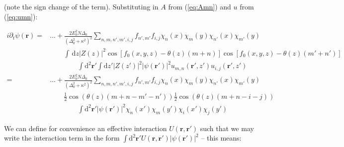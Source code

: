 \documentclass[a4paper,nobalancelastpage]{revtex4-1}
\newcommand{\vect}[1]{\bm{#1}}
\begin{document}
(note the sign change of the term). Substituting in $A$ from (\ref{eq:Amn}) and $u$ from (\ref{eq:umn}):

\begin{align}
i \partial_t \psi(\vect{r})=&...+ \frac{ 2E^2_0 N \Delta_0 }{(\Delta_0^2+\kappa^2)^2} \sum_{n,m,n',m',i,j}f_{n',m'} f_{i,j}
\chi_n\left( x \right)
  \chi_m\left( y \right) \chi_{n'}\left( x \right)
  \chi_{m'}\left( y \right) \nonumber  \\& \qquad
   \int \, \mathrm{d}z |Z(z)|^2    \cos \left[ f_0(x,y,z) - \theta(z) (m+n) \right]  \cos \left[ f_0(x,y,z) - \theta(z) (m'+n') \right] 
 \nonumber \\ &  \qquad \qquad
  \int \mathrm{d}^2 \vect{r'}  \int  \mathrm{d}z' |Z(z')|^2 |\psi(\vect{r}')|^2 u_{m,n}(\vect{r}',z') u_{i,j}(\vect{r}',z')
  \\ =&
  ...+ \frac{ 2E^2_0 N \Delta_0 }{(\Delta_0^2+\kappa^2)^2} \sum_{n,m,n',m',i,j}f_{n',m'} f_{i,j}
\chi_n\left( x \right)
  \chi_m\left( y \right) \chi_{n'}\left( x \right)
  \chi_{m'}\left( y \right) \nonumber  \\& \qquad
   \frac{1}{2} \cos \left( \theta(z) (m+n-m'-n') \right) \frac{1}{2} \cos \left( \theta(z) (m+n-i-j) \right)  
 \nonumber \\ &  \qquad \qquad
  \int \mathrm{d}^2 \vect{r'}  |\psi(\vect{r}')|^2 \chi_n\left( x' \right) \chi_m\left( y' \right) \chi_i\left( x' \right) \chi_j\left( y' \right)
\end{align}

We can define for convenience an effective interaction $U(\vect{r},\vect{r}')$ such that we may write the interaction term in the form $ \int \mathrm{d}^2 \vect{r'} U(\vect{r},\vect{r}')  |\psi(\vect{r}')|^2  $ -- this means:
\end{document}
